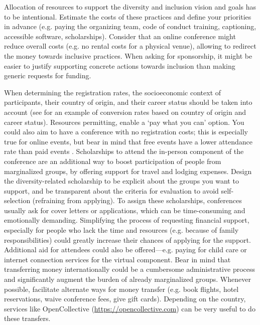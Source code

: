\documentclass[10pt,letterpaper]{article}
\begin{document}
Allocation of resources to support the diversity and inclusion vision and goals has to be intentional. 
Estimate the costs of these practices and define your priorities in advance (e.g. paying the organizing team, code of conduct training, captioning, accessible software, scholarships).
Consider that an online conference might reduce overall costs (e.g. no rental costs for a physical venue), allowing to redirect the money towards inclusive practices. 
When asking for sponsorship, it might be easier to justify supporting concrete actions towards inclusion than making generic requests for funding.

When determining the registration rates, the socioeconomic context of participants, their country of origin, and their career status should be taken into account  \cite{sarabipourChangingScientificMeetings2021, andalibPostdocQueueLabour2018, kaplanPostdocNot2012}
(see \cite{canelon2021cost} for an example of conversion rates based on country of origin and career status). 
Resources permitting, enable a `pay what you can' option. You could also aim to have a conference with no registration costs; this is especially true for online events, but bear in mind that free events have a lower attendance rate than paid events \cite{eventbrite_ultimate_2017}. 
Scholarships to attend the in-person component of the conference are an additional way to boost participation of people from marginalized groups, by offering support for travel and lodging expenses.
Design the diversity-related scholarship to be explicit about the groups you want to support, and be transparent about the criteria for evaluation to avoid self-selection (refraining from applying). 
To assign these scholarships, conferences usually ask for cover letters or applications, which can be time-consuming and emotionally demanding. 
Simplifying the process of requesting financial support, especially for 
people who lack the time and resources (e.g. because of family responsibilities) could greatly increase their chances of applying for the support. 
Additional aid for attendees could also be offered—e.g. paying for child care or internet connection services for the virtual component. 
Bear in mind that transferring money internationally could be a cumbersome administrative process and significantly augment the burden of already marginalized groups. Whenever possible, facilitate alternate ways for money transfer (e.g. book flights, hotel reservations, waive conference fees, give gift cards). Depending on the country, services like OpenCollective (\url{https://opencollective.com}) can be very useful to do these transfers. 
\end{document}
